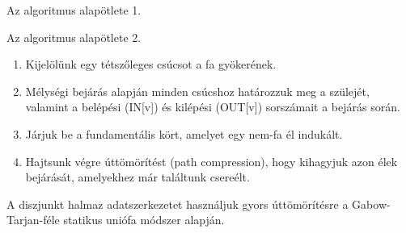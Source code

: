 \begin{frame}{Az algoritmus alapötlete 1.}

  \medskip
\end{frame}

\begin{frame}{Az algoritmus alapötlete 2.}
  \small
  \begin{enumerate}
    \item Kijelölünk egy tétszőleges csúcsot a fa gyökerének.
    \item Mélységi bejárás alapján minden csúcshoz határozzuk meg a szülejét, valamint a belépési (IN[v]) és kilépési (OUT[v]) sorszámait a bejárás során.
    \item Járjuk be a fundamentális kört, amelyet egy nem-fa él indukált.
    \item Hajtsunk végre úttömörítést (path compression), hogy kihagyjuk azon élek bejárását, amelyekhez már találtunk csereélt.
  \end{enumerate}
  A diszjunkt halmaz adatszerkezetet használjuk gyors úttömörítésre a Gabow-Tarjan-féle statikus uniófa módszer alapján.
\end{frame}